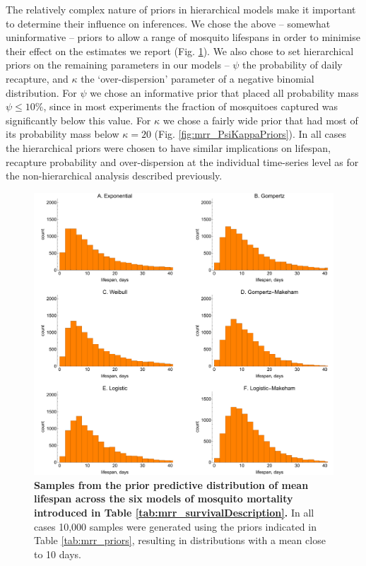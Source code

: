 \documentclass[12pt]{article}
\begin{document}
The relatively complex nature of priors in hierarchical models make it important to determine their influence on inferences. We chose the above -- somewhat uninformative -- priors to allow a range of mosquito lifespans in order to minimise their effect on the estimates we report (Fig. \ref{fig:mrr_meanLifespanPrior}). We also chose to set hierarchical priors on the remaining parameters in our models -- $\psi$ the probability of daily recapture, and $\kappa$ the `over-dispersion' parameter of a negative binomial distribution. For $\psi$ we chose an informative prior that placed all probability mass $\psi\leq 10\%$, since in most experiments the fraction of mosquitoes captured was significantly below this value. For $\kappa$ we chose a fairly wide prior that had most of its probability mass below $\kappa=20$ (Fig. \ref{fig:mrr_PsiKappaPriors}). In all cases the hierarchical priors were chosen to have similar implications on lifespan, recapture probability and over-dispersion at the individual time-series level as for the non-hierarchical analysis described previously.

\begin{figure}[h]
	\centerline{\includegraphics[width=1\textwidth]{./Figure_files/mrr_lifespan_priors.pdf}}
	\caption{\textbf{Samples from the prior predictive distribution of mean lifespan across the six models of mosquito mortality introduced in Table \ref{tab:mrr_survivalDescription}.} In all cases 10,000 samples were generated using the priors indicated in Table \ref{tab:mrr_priors}, resulting in distributions with a mean close to 10 days.}
	\label{fig:mrr_meanLifespanPrior}
\end{figure}
\end{document}
